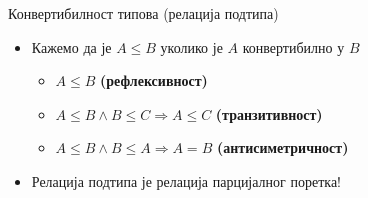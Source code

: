 \documentclass[xcolor=table]{beamer}
\begin{document}
    \begin{frame}{Конвертибилност типова (релација подтипа)}
        \begin{itemize}
            \item Кажемо да је \begin{math}A \leq B\end{math} уколико је \begin{math}A\end{math} конвертибилно у \begin{math}B\end{math}
            \begin{itemize}
                \item \begin{math}A \leq B\end{math} \textbf{(рефлексивност)}
                \item \begin{math}A \leq B \wedge B \leq C \Rightarrow A \leq C\end{math} \textbf{(транзитивност)}
                \item \begin{math}A \leq B \wedge B \leq A \Rightarrow A = B\end{math} \textbf{(антисиметричност)}
            \end{itemize}
            \item Релација подтипа је релација парцијалног поретка!
        \end{itemize}
    \end{frame}
\end{document}
